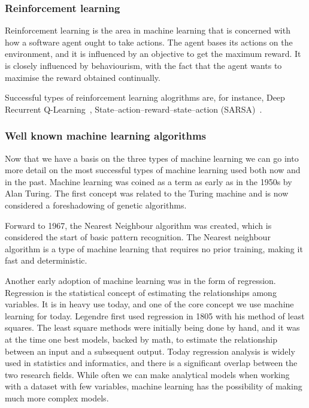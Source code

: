  
      

      
\subsubsection{Reinforcement learning}
Reinforcement learning is the area in machine learning that is concerned with how a software agent ought to take actions.
The agent bases its actions on the environment, and it is influenced by an objective to get the maximum reward.
It is closely influenced by behaviourism, with the fact that the agent wants to maximise the reward obtained continually. 

Successful types of reinforcement learning alogrithms are, for instance, Deep Recurrent Q-Learning~\cite{DBLP:journals/corr/HausknechtS15}, State–action–reward–state–action (SARSA)~\cite{Rummery94on-lineq-learning}.



\subsubsection{Well known machine learning algorithms}
Now that we have a basis on the three types of machine learning we can go into more detail on the most successful types of machine learning used both now and in the past. 
Machine learning was coined as a term as early as in the 1950s by Alan Turing. The first concept was related to the Turing machine and is now considered a foreshadowing of genetic algorithms.~\cite{10.1093/mind/LIX.236.433}

\vspace{5px}

Forward to 1967, the Nearest Neighbour algorithm was created, which is considered the start of basic pattern recognition. The Nearest neighbour algorithm is a type of machine learning that requires no prior training, making it fast and deterministic.

\vspace{5px}

Another early adoption of machine learning was in the form of regression. Regression is the statistical concept of estimating the relationships among variables. It is in heavy use today, and one of the core concept we use machine learning for today. 
Legendre first used regression in 1805 with his method of least squares. The least square methods were initially being done by hand, and it was at the time one best models, backed by math, to estimate the relationship between an input and a subsequent output. 
Today regression analysis is widely used in statistics and informatics, and there is a significant overlap between the two research fields. While often we can make analytical models when working with a dataset with few variables, machine learning has the possibility of making much more complex models.

